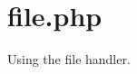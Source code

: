 \hypertarget{file_8php-example}{
\section{file.php}
}
Using the file handler.


\begin{DoxyCodeInclude}
\end{DoxyCodeInclude}
 